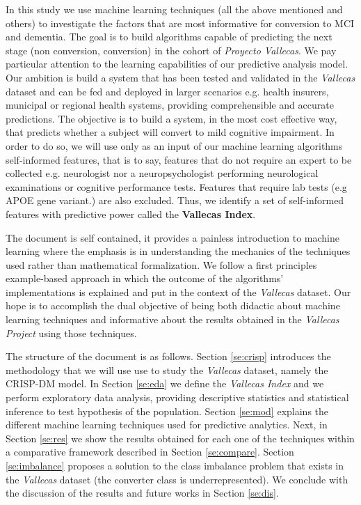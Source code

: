 \documentclass[11pt]{article}
\theoremstyle{definition}
\theoremstyle{remark}
\begin{document}
In this study we use machine learning techniques (all the above mentioned and others) to investigate the factors that are most informative for conversion to MCI and dementia. The goal is to build algorithms capable of predicting the next stage (non conversion, conversion) in the cohort of \emph{Proyecto Vallecas}. We pay particular attention to the learning capabilities of our predictive analysis model. Our ambition is build a system that has been tested and validated in the \textit{Vallecas} dataset and can be fed and deployed in larger scenarios e.g. health insurers, municipal or regional health systems, providing comprehensible and accurate predictions. The objective is to build a system, in the most cost effective way, that predicts whether a subject will convert to mild cognitive impairment. In order to do so, we will use only as an input of our machine learning algorithms self-informed features, that is to say, features that do not require an expert to be collected e.g. neurologist nor a neuropsychologist performing neurological examinations or cognitive performance tests. Features that require lab tests (e.g APOE gene variant.) are also excluded.
Thus, we identify a set of self-informed features with predictive power called the \textbf{Vallecas Index}. 

The document is self contained, it provides a painless introduction to machine learning where the emphasis is in understanding the mechanics of the techniques used rather than mathematical formalization. We follow a first principles example-based approach in which the outcome of the algorithms' implementations is explained and put in the context of the  \emph{Vallecas} dataset. Our hope is to accomplish the dual objective of being both didactic about machine learning techniques and informative about the results obtained in the \emph{Vallecas Project} using those techniques.

The structure of the document is as follows. Section \ref{se:crisp} introduces the methodology that we will use use to study the \emph{Vallecas} dataset, namely the CRISP-DM model. In Section \ref{se:eda} we define the \emph{Vallecas Index} and we perform exploratory data analysis, providing descriptive statistics and statistical inference to test hypothesis of the population. Section \ref{se:mod} explains the different machine learning techniques used for predictive analytics. Next, in Section \ref{se:res} we show the results obtained for each one of the techniques within a comparative framework described in Section \ref{se:compare}. Section \ref{se:imbalance} proposes a solution to the class imbalance problem that exists in the \emph{Vallecas} dataset (the converter class is underrepresented). We conclude with the discussion of the results and future works in Section \ref{se:dis}.
\end{document}
